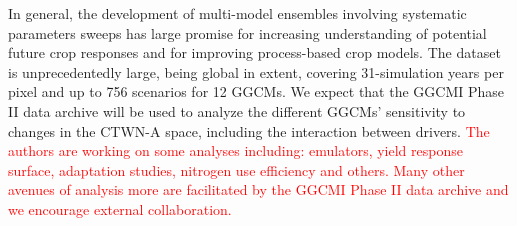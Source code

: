 \documentclass[gmd, manuscript]{copernicus} %
\begin{document}

In general, the development of multi-model ensembles involving systematic parameters sweeps has large promise for increasing understanding of potential future crop responses and for improving process-based crop models.
The dataset is unprecedentedly large, being global in extent, covering 31-simulation years per pixel and up to 756 scenarios for 12 GGCMs.
We expect that the GGCMI Phase II data archive will be used to analyze the different GGCMs' sensitivity to changes in the CTWN-A space, including the interaction between drivers.
\textcolor{red}{The authors are working on some analyses including: emulators, yield response surface, adaptation studies, nitrogen use efficiency and others.
Many other avenues of analysis more are facilitated by the GGCMI Phase II data archive and we encourage external collaboration.}


\end{document}
